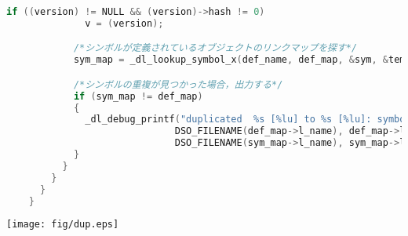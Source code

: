 \documentclass[submit,techreq,noauthor]{eco}	%
\begin{document}
\begin{figure*}[t]
\begin{lstlisting}[language=c]
            if ((version) != NULL && (version)->hash != 0)
              v = (version);

            /*シンボルが定義されているオブジェクトのリンクマップを探す*/
            sym_map = _dl_lookup_symbol_x(def_name, def_map, &sym, &temp_scope, v, _tc, DL_LOOKUP_ADD_DEPENDENCY | DL_LOOKUP_FOR_RELOCATE, 0);

            /*シンボルの重複が見つかった場合，出力する*/
            if (sym_map != def_map)
            {
              _dl_debug_printf("duplicated  %s [%lu] to %s [%lu]: symbol `%s'\n",
                              DSO_FILENAME(def_map->l_name), def_map->l_ns,
                              DSO_FILENAME(sym_map->l_name), sym_map->l_ns,def_name);
            }
          }
        }
      }
    }
  \end{lstlisting}
	\label{listings:code}
\end{figure*}

\begin{figure*}[t]
	\centering
  \texttt{[image: fig/dup.eps]}
	\caption{シンボル重複の検出結果}
	\label{fig:duplicate}
\end{figure*}



\setlength\baselineskip{12pt}
{\small
	
	
}
\end{document}
